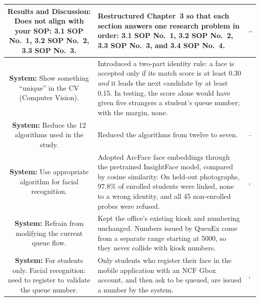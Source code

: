 \documentclass[12pt,letterpaper]{article}
\newcommand{\sysname}{QueuEx}
\newcommand{\pg}[1]{\large #1}
\begin{document}
\begin{longtable}{|S|A|P|}
\textbf{Results and Discussion:}\newline
Does not align with your SOP: 3.1 SOP No.~1, 3.2 SOP No.~2, 3.3 SOP
No.~3.
&
Restructured Chapter~3 so that each section answers one research
problem in order: 3.1 SOP No.~1, 3.2 SOP No.~2, 3.3 SOP No.~3, and
3.4 SOP No.~4.
&
\pg{\pageref{sec:sop1-results}--\pageref{sec:sop4-results}} \\ \hline

\textbf{System:}\newline
Show something ``unique'' in the CV (Computer Vision).
&
Introduced a two-part identity rule: a face is accepted only if its
match score is at least 0.30 \emph{and} it leads the next candidate by
at least 0.15. In testing, the score alone would have given five
strangers a student's queue number; with the margin, none.
&
\pg{\pageref{tab:margin-caught}} \\ \hline

\textbf{System:}\newline
Reduce the 12 algorithms used in the study.
&
Reduced the algorithms from twelve to seven.
&
\pg{\pageref{subsec:cv-layer}--\pageref{subsec:ticket}} \\ \hline

\textbf{System:}\newline
Use appropriate algorithm for facial recognition.
&
Adopted ArcFace face embeddings through the pretrained InsightFace
model, compared by cosine similarity. On held-out photographs, 97.8\% of
enrolled students were linked, none to a wrong identity, and all 45
non-enrolled probes were refused.
&
\pg{\pageref{subsec:reid}, \pageref{subsec:heldout-accuracy}} \\ \hline

\textbf{System:}\newline
Refrain from modifying the current queue flow.
&
Kept the office's existing kiosk and numbering unchanged. Numbers issued
by \sysname{} come from a separate range starting at 5000, so they never
collide with kiosk numbers.
&
\pg{\pageref{subsec:reid}} \\ \hline

\textbf{System:}\newline
For students only. Facial recognition: need to register to validate the
queue number.
&
Only students who register their face in the mobile application with an
NCF Gbox account, and then ask to be queued, are issued a number by the
system.
&
\pg{\pageref{sec:scope}, \pageref{fig:detection-ticket-pipeline}} \\ \hline


\end{longtable}
\end{document}
